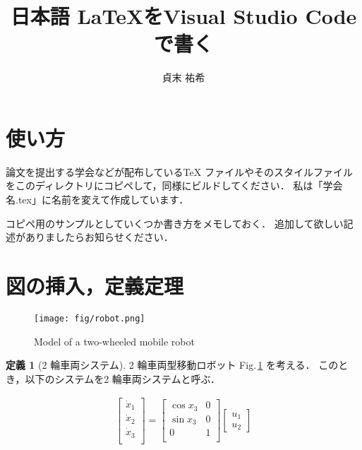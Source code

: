 \documentclass[twocolumn]{jarticle}
\newcommand{\figref}[1]{Fig.\,\ref{#1}}
\theoremstyle{definition}
\newtheorem{definition}{定義}
\begin{document}
\title{日本語 \LaTeX をVisual Studio Code で書く}
\author{貞末 祐希}
\maketitle

\section{使い方}
論文を提出する学会などが配布しているTeX ファイルやそのスタイルファイルをこのディレクトリにコピペして，同様にビルドしてください．
私は「学会名.tex」に名前を変えて作成しています．

コピペ用のサンプルとしていくつか書き方をメモしておく．
追加して欲しい記述がありましたらお知らせください．

\section{図の挿入，定義定理}
\begin{figure}[tb] %
  \begin{center}
      \texttt{[image: fig/robot.png]}
  \end{center}
  \caption{Model of a two-wheeled mobile robot\label{fig:two_wheeled_mobile_robot}}
\end{figure}


\begin{definition}[2 輪車両システム]
  \label{def:system}
  2 輪車両型移動ロボット \figref{fig:two_wheeled_mobile_robot} を考える．
  このとき，以下のシステムを2 輪車両システムと呼ぶ．

  \begin{align}
    \left[
      \begin{array}{c}
      \dot x_1 \\
      \dot x_2 \\
      \dot x_3 \\
      \end{array}
    \right]
    =
    \left[
      \begin{array}{cc}
      \cos x_3 & 0\\
      \sin x_3 & 0\\
      0 & 1 \\
      \end{array}
    \right]
    \left[
    \begin{array}{cc}
    u_1 \\
    u_2
    \end{array}
    \right]
    \label{system:two_wheeled_mobile_robot}
  \end{align}
\end{definition}
\end{document}
